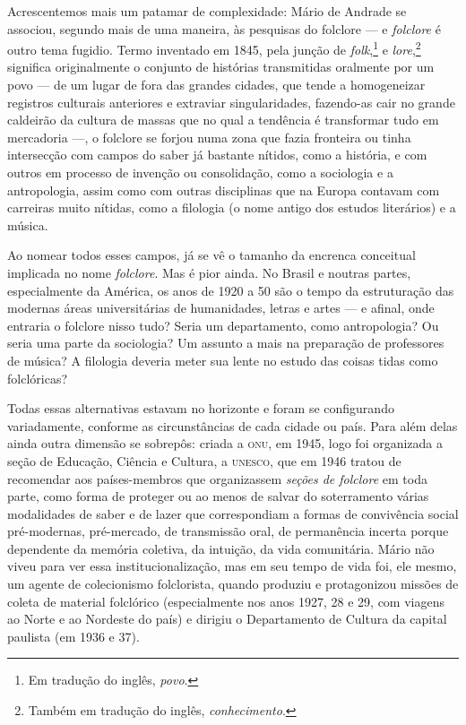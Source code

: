 Acrescentemos mais um patamar de complexidade: Mário de Andrade se associou, 
segundo mais de uma maneira, às pesquisas
do folclore --- e \textit{folclore} é outro tema fugidio. Termo inventado em
1845, pela junção de \textit{folk},\footnote{Em tradução do inglês, \textit{povo}.} e \textit{lore},\footnote{Também em tradução do inglês, \textit{conhecimento}.}
significa originalmente o conjunto de histórias transmitidas
oralmente por um povo --- de um lugar de fora das grandes
cidades, que tende a homogeneizar registros culturais
anteriores e extraviar singularidades, fazendo-as cair no grande
caldeirão da cultura de massas que no qual a tendência é transformar tudo em
mercadoria ---, o folclore se forjou numa zona que fazia fronteira ou
tinha intersecção com campos do saber já bastante nítidos, como a
história, e com outros em processo de invenção ou consolidação, como a
sociologia e a antropologia, assim como com outras disciplinas que na
Europa contavam com carreiras muito nítidas, como a filologia (o nome
antigo dos estudos literários) e a música.

Ao nomear todos esses campos, já se vê o tamanho da encrenca conceitual
implicada no nome \textit{folclore}. Mas é pior ainda. No Brasil e noutras
partes, especialmente da América, os anos de 1920 a 50 são o tempo da
estruturação das modernas áreas universitárias de humanidades, letras e
artes --- e afinal, onde entraria o folclore nisso tudo? Seria um
departamento, como antropologia? Ou seria uma parte da sociologia? Um
assunto a mais na preparação de professores de música? A filologia
deveria meter sua lente no estudo das coisas tidas como folclóricas?

Todas essas alternativas estavam no horizonte e foram se configurando
variadamente, conforme as circunstâncias de cada cidade ou país. Para
além delas ainda outra dimensão se sobrepôs: criada a \textsc{onu}, em 1945, logo
foi organizada a seção de Educação, Ciência e Cultura, a \textsc{unesco}, que em
1946 tratou de recomendar aos países-membros que organizassem \textit{seções
de folclore} em toda parte, como forma de proteger ou ao menos de
salvar do soterramento várias modalidades de saber e de lazer que
correspondiam a formas de convivência social pré-modernas, pré-mercado,
de transmissão oral, de permanência incerta porque dependente da memória
coletiva, da intuição, da vida comunitária. Mário não viveu para ver
essa institucionalização, mas em seu tempo de vida foi, ele mesmo, um
agente de colecionismo folclorista, quando produziu e protagonizou
missões de coleta de material folclórico (especialmente nos anos 1927,
28 e 29, com viagens ao Norte e ao Nordeste do país) e dirigiu o
Departamento de Cultura da capital paulista (em 1936 e 37).

